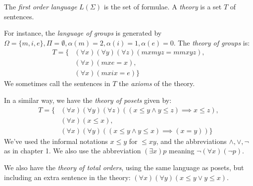 \documentclass[10pt,a4paper]{article}
\begin{document}
The \emph{first order language} $L(\Sigma)$ is the set of formulae. A \emph{theory} is a set $T$ of sentences.

For instance, the \emph{language of groups} is generated by $\Omega = \{m,i,e\}, \Pi = \emptyset, \alpha(m) = 2, \alpha(i) = 1, \alpha(e) = 0$. The \emph{theory of groups} is:
\begin{align*}
T = \big\{&(\forall x)(\forall y)(\forall z)(mxmyz = mmxyz), \tag{associativity}\\
&(\forall x)(mxe = x), \tag{identity}\\
&(\forall x)(mxix = e)\big\} \tag{inverses}
\end{align*}
We sometimes call the sentences in $T$ the \emph{axioms} of the theory.

In a similar way, we have the \emph{theory  of posets} given by:
\begin{align*}
T = \big\{& (\forall x)(\forall y)(\forall z)((x \leq y \wedge y \leq z) \implies x \leq z),\\
&(\forall x)(x \leq x),\\
&(\forall x)(\forall y)((x \leq y \wedge y \leq x) \implies (x=y))\big\}
\end{align*}
We've used the informal notations $x \leq y$ for $\leq xy$, and the abbreviations $\wedge, \vee, \neg$ as in chapter 1. We also use the abbreviation $(\exists x)p$ meaning $\neg (\forall x)(\neg p)$.

We also have the \emph{theory of total orders}, using the same language as posets, but including an extra sentence in the theory: $(\forall x)(\forall y)(x \leq y \vee y \leq x)$. 
\end{document}
